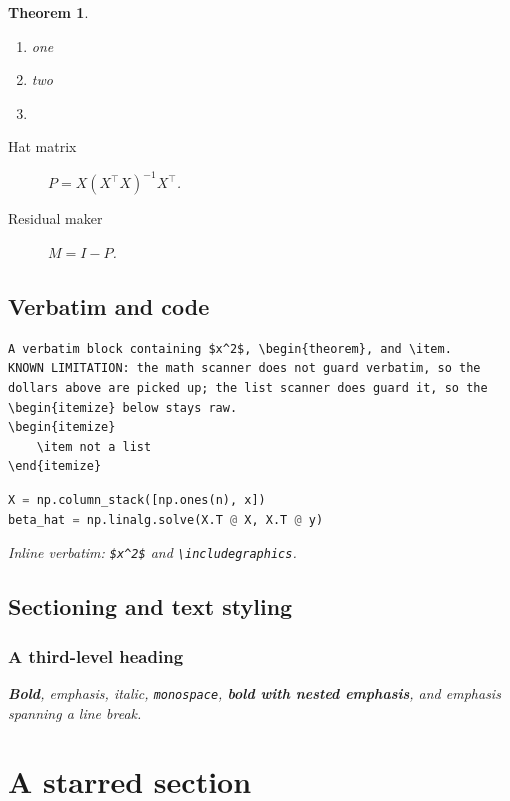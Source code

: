 \documentclass[11pt]{article}
\newtheorem{theorem}{Theorem}
\theoremstyle{definition}
\theoremstyle{remark}
\begin{document}
{\begin{theorem}
\begin{enumerate}
    \item one
    \item two
    \item
\end{enumerate}

\begin{description}
    \item[Hat matrix] $P = X(X^\top X)^{-1}X^\top$.
    \item[Residual maker] $M = I - P$.
\end{description}

\subsection{Verbatim and code}

\begin{verbatim}
A verbatim block containing $x^2$, \begin{theorem}, and \item.
KNOWN LIMITATION: the math scanner does not guard verbatim, so the
dollars above are picked up; the list scanner does guard it, so the
\begin{itemize} below stays raw.
\begin{itemize}
    \item not a list
\end{itemize}
\end{verbatim}

\begin{lstlisting}[language=Python]
X = np.column_stack([np.ones(n), x])
beta_hat = np.linalg.solve(X.T @ X, X.T @ y)
\end{lstlisting}

Inline verbatim: \verb|$x^2$| and \texttt{\textbackslash includegraphics}.

\subsection{Sectioning and text styling}

\subsubsection{A third-level heading}

\textbf{Bold}, \emph{emphasis}, \textit{italic}, \texttt{monospace},
\textbf{bold with \emph{nested emphasis}}, and \emph{emphasis spanning
a line break}.

\section*{A starred section}


\end{theorem}}
\end{document}
